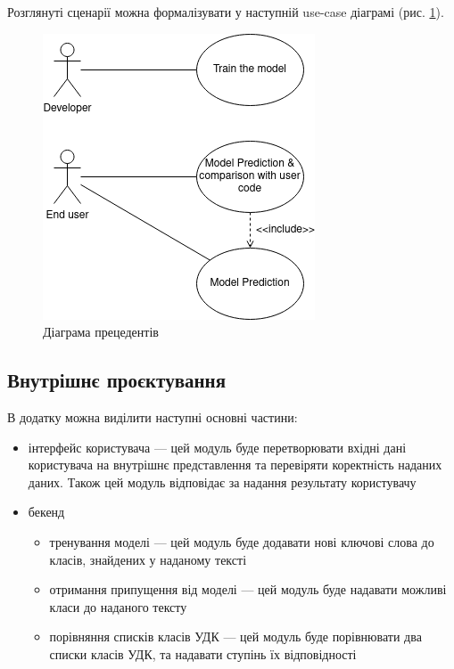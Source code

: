 \documentclass[14pt]{extarticle}
\begin{document}
  Розглянуті сценарії можна формалізувати у наступній use-case діаграмі
  (рис. \ref{fig:use-case}).

  \begin{figure}[H]
    \centering
    \includegraphics{use-case.drawio.png}
    \captionsetup{justification=centering}  
    \caption{Діаграма прецедентів}
    \label{fig:use-case}
  \end{figure}

  \subsection{Внутрішнє проєктування}
  В додатку можна виділити наступні основні частини:
  \begin{itemize}[labelindent=\dimexpr{}\relax, leftmargin=*]
    \item інтерфейс користувача --- цей модуль буде перетворювати вхідні дані користувача на внутрішнє представлення та перевіряти коректність наданих даних. Також цей модуль відповідає за надання результату користувачу
    \item бекенд
      \begin{itemize}[labelindent=\dimexpr\parindent\relax, leftmargin=*]
        \item тренування моделі --- цей модуль буде додавати нові ключові слова до класів, знайдених у наданому тексті
        \item отримання припущення від моделі --- цей модуль буде надавати можливі класи до наданого тексту
        \item порівняння списків класів УДК --- цей модуль буде порівнювати два списки класів УДК, та надавати ступінь їх відповідності
      \end{itemize}
  \end{itemize}
  
\end{document}
